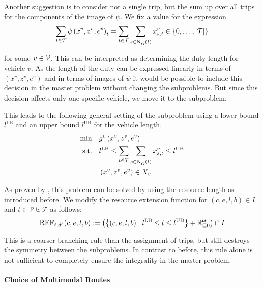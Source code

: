 Another suggestion is to consider not a single trip, but the sum up over all trips for the components of the image of $\psi$. We fix a value for the expression
\begin{align*}
	\sum_{t\in\mathcal{T}}\psi\left(x^v,z^v,e^v\right)_t = \sum_{t\in\mathcal{T}} \sum_{s\in\operatorname{N}_G^-(t)} x^v_{s,t} \in\left\{0,\dots,\vert\mathcal{T}\vert\right\}
\end{align*}

for some $v\in\mathcal{V}$. This can be interpreted as determining the duty length for vehicle $v$. As the length of the duty can be expressed linearly in terms of $\left(x^v,z^v,e^v\right)$ and in terms of images of $\psi$ it would be possible to include this decision in the master problem without changing the subproblems. But since this decision affects only one specific vehicle, we move it to the subproblem.

This leads to the following general setting of the subproblem using a lower bound $l^{\operatorname{LB}}$ and an upper bound $l^{\operatorname{UB}}$ for the vehicle length.
\begin{align}
	\min \quad & g^v\left(x^v,z^v,e^v\right) \nonumber \\
	\text{s.t.} \quad & l^{\operatorname{LB}} \leq \sum_{t\in\mathcal{T}} \sum_{s\in\operatorname{N}_G^-(t)} x^v_{s,t} \leq l^{\operatorname{UB}} \label{eq:SPv:duty_length} \\
	& \left(x^v,z^v,e^v\right)\in X_v \nonumber
\end{align}

As proven by \cite{Kaiser}, this problem can be solved by using the resource length as introduced before. We modify the resource extension function for $(c,e,l,b)\in I$ and ${t\in\mathcal{V}\cupdot\mathcal{T}}$ as follows:
\begin{align*}
	\operatorname{REF}_{t,d^{\operatorname{e}}}(c,e,l,b) := \left(\left\{(c,e,l,b)\mid l^{\operatorname{LB}}\leq l \leq l^{\operatorname{UB}}\right\} + \mathbb{R}^{\mathcal{U}}_{\sqsubseteq 0}\right) \cap I
\end{align*}

This is a coarser branching rule than the assignment of trips, but still destroys the symmetry between the subproblems. In contrast to before, this rule alone is not sufficient to completely ensure the integrality in the master problem.

\newpage

\paragraph{Choice of Multimodal Routes} \parfill

